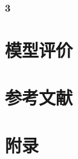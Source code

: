 \documentclass[UTF8]{ctexart}
\begin{document}
	\subsubsection{3}
	
	\section{模型评价}
	
	
	\section{参考文献}
	
	\section{附录}
	\begin{appendices}
		
	\end{appendices}
	
\end{document}
